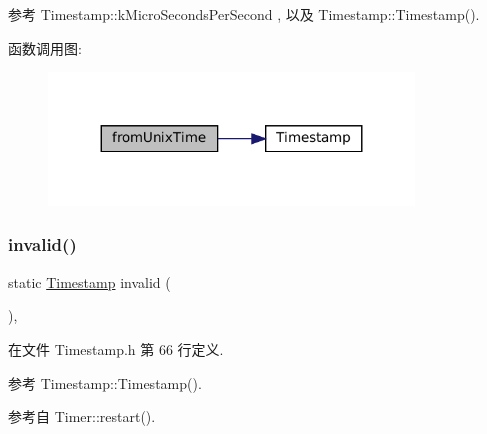 参考 Timestamp\+::k\+Micro\+Seconds\+Per\+Second , 以及 Timestamp\+::\+Timestamp().

函数调用图\+:
\nopagebreak
\begin{figure}[H]
\begin{center}
\leavevmode
\includegraphics[width=275pt]{classmuduo_1_1Timestamp_a610b35a1215297acd5117d0006e64434_cgraph}
\end{center}
\end{figure}
\mbox{\label{classmuduo_1_1Timestamp_a1aa83f32d706090ef354b182460d27aa}} 
\subsubsection{\texorpdfstring{invalid()}{invalid()}}
{\footnotesize\ttfamily static \hyperlink{classmuduo_1_1Timestamp}{Timestamp} invalid (\begin{DoxyParamCaption}{ }\end{DoxyParamCaption})\hspace{0.3cm}{\ttfamily [inline]}, {\ttfamily [static]}}



在文件 Timestamp.\+h 第 66 行定义.



参考 Timestamp\+::\+Timestamp().



参考自 Timer\+::restart().

